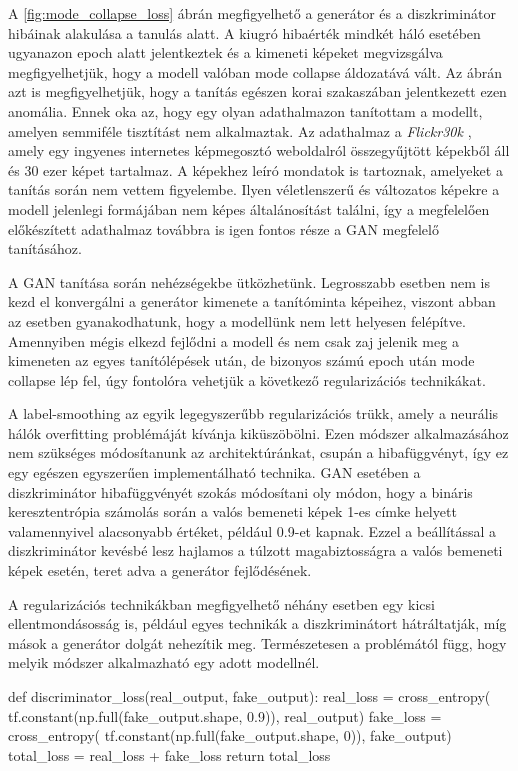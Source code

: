 A \ref{fig:mode_collapse_loss} ábrán megfigyelhető a generátor és a diszkriminátor hibáinak alakulása a tanulás alatt. A kiugró hibaérték mindkét háló esetében ugyanazon epoch alatt jelentkeztek és a kimeneti képeket megvizsgálva megfigyelhetjük, hogy a modell valóban mode collapse áldozatává vált. Az ábrán azt is megfigyelhetjük, hogy a tanítás egészen korai szakaszában jelentkezett ezen anomália. Ennek oka az, hogy egy olyan adathalmazon tanítottam a modellt, amelyen semmiféle tisztítást nem alkalmaztak. Az adathalmaz a \textit{Flickr30k} \cite{young2014image}, amely egy ingyenes internetes képmegosztó weboldalról összegyűjtött képekből áll és 30 ezer képet tartalmaz. A képekhez leíró mondatok is tartoznak, amelyeket a tanítás során nem vettem figyelembe. Ilyen véletlenszerű és változatos képekre a modell jelenlegi formájában nem képes általánosítást találni, így a megfelelően előkészített adathalmaz továbbra is igen fontos része a GAN megfelelő tanításához.

A GAN tanítása során nehézségekbe ütközhetünk. Legrosszabb esetben nem is kezd el konvergálni a generátor kimenete a tanítóminta képeihez, viszont abban az esetben gyanakodhatunk, hogy a modellünk nem lett helyesen felépítve. Amennyiben mégis elkezd fejlődni a modell és nem csak zaj jelenik meg a kimeneten az egyes tanítólépések után, de bizonyos számú epoch után mode collapse lép fel, úgy fontolóra vehetjük a következő regularizációs technikákat.

A label-smoothing az egyik legegyszerűbb regularizációs trükk, amely a neurális hálók overfitting problémáját kívánja kiküszöbölni. Ezen módszer alkalmazásához nem szükséges módosítanunk az architektúránkat, csupán a hibafüggvényt, így ez egy egészen egyszerűen implementálható technika. GAN esetében a diszkriminátor hibafüggvényét szokás módosítani oly módon, hogy a bináris keresztentrópia számolás során a valós bemeneti képek 1-es címke helyett valamennyivel alacsonyabb értéket, például 0.9-et kapnak. Ezzel a beállítással a diszkriminátor kevésbé lesz hajlamos a túlzott magabiztosságra a valós bemeneti képek esetén, teret adva a generátor fejlődésének.

A regularizációs technikákban megfigyelhető néhány esetben egy kicsi ellentmondásosság is, például egyes technikák a diszkriminátort hátráltatják, míg mások a generátor dolgát nehezítik meg. Természetesen a problémától függ, hogy melyik módszer alkalmazható egy adott modellnél.

\begin{python}
def discriminator_loss(real_output, fake_output):
    real_loss = cross_entropy(
	    tf.constant(np.full(fake_output.shape, 0.9)),
	    real_output)
    fake_loss = cross_entropy(
	    tf.constant(np.full(fake_output.shape, 0)),
	    fake_output)
    total_loss = real_loss + fake_loss
    return total_loss
\end{python}

